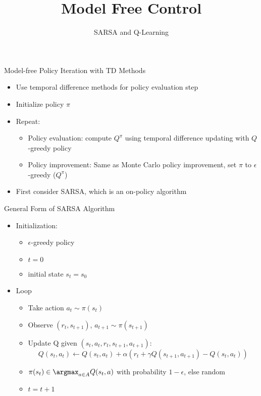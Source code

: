 


\title[RL: Model Free Control]{Model Free Control}
\subtitle{SARSA and Q-Learning}



	
	\maketitle

\begin{frame}[c]{Model-free Policy Iteration with TD Methods}
	
	\begin{itemize}
		\item Use temporal difference methods for policy evaluation step
		\item Initialize policy $\pi$
		\item Repeat:
		\begin{itemize}
			\item Policy evaluation: compute $Q^\pi$ using temporal difference updating
			with $Q$-greedy policy
			\item Policy improvement: Same as Monte Carlo policy improvement, set $\pi$
			to $\epsilon$-greedy ($Q^\pi$)
		\end{itemize}
		\item First consider SARSA, which is an on-policy algorithm
	\end{itemize}
	
\end{frame}
\begin{frame}[c]{General Form of SARSA Algorithm}
	
	\begin{itemize}
		\item Initialization:
		\begin{itemize}
			\item $\epsilon$-greedy policy 
			\item $t=0$
			\item initial state $s_t = s_0$
		\end{itemize} 
		\item Loop
		\begin{itemize}
			\item Take action $a_t \sim \pi(s_t)$
			\item Observe $(r_t, s_{t+1})$, $a_{t+1} \sim \pi(s_{t+1})$
			\item Update Q given $(s_t, a_t, r_t, s_{t+1}, a_{t+1})$:
			$$Q(s_t,a_t) \gets Q(s_t, a_t) + \alpha (r_t + \gamma Q(s_{t+1}, a_{t+1}) - Q(s_t, a_t))$$
			\item $\pi(s_t) \in \argmax_{a\in A} Q(s_t, a)$ with probability $1-\epsilon$, else random
			\item $t = t+1$
		\end{itemize} 
	\end{itemize}
	
\end{frame}
